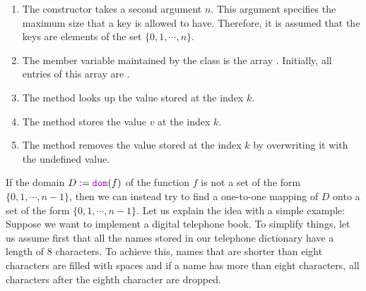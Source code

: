 \begin{enumerate}
\item The constructor takes a second argument $n$.  This argument specifies the
      maximum size that a key is allowed to have.  Therefore, it is assumed that
      the keys are elements of the set $\{0,1, \cdots, n\}$.
\item The member variable maintained by the class  is the array .
      Initially, all entries of this array are .
\item The method  looks up the value stored at the index $k$.
\item The method  stores the value $v$ at the index $k$.
\item The method  removes the value stored at the index $k$ by overwriting it with the undefined
      value. 
\end{enumerate}
If the domain $D := \mytt{dom}(f)$ of the function $f$ is not a set of the form $\{0,1, \cdots, n-1\}$, 
then we can instead try to find a one-to-one mapping of $D$ onto a set of the form $\{0,1,\cdots,n-1\}$.
Let us explain the idea with a simple example:  Suppose we want to implement a digital
telephone book.
To simplify things, let us assume first that all the names stored in our telephone dictionary
have a length of 8 characters.  To achieve this, names that are shorter than eight characters
are filled with spaces and if a name has more than eight characters, all characters after the
eighth character are dropped.

